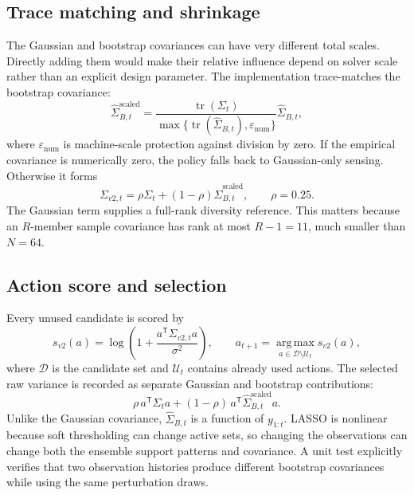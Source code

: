 \documentclass[11pt,a4paper]{article}
\newcommand{\tr}{\operatorname{tr}}
\newcommand{\argmax}{\operatorname*{arg\,max}}
\newcommand{\trans}{^{\mathsf T}}
\begin{document}
\subsection{Trace matching and shrinkage}

The Gaussian and bootstrap covariances can have very different total scales.  Directly
adding them would make their relative influence depend on solver scale rather than an
explicit design parameter.  The implementation trace-matches the bootstrap covariance:
\begin{equation}
\widehat{\Sigma}_{B,t}^{\mathrm{scaled}}
=\frac{\tr(\Sigma_t)}
{\max\{\tr(\widehat{\Sigma}_{B,t}),\varepsilon_{\mathrm{num}}\}}
\widehat{\Sigma}_{B,t},
\label{eq:trace-matching}
\end{equation}
where $\varepsilon_{\mathrm{num}}$ is machine-scale protection against division by zero.  If
the empirical covariance is numerically zero, the policy falls back to Gaussian-only
sensing.  Otherwise it forms
\begin{equation}
\Sigma_{v2,t}
=\rho\Sigma_t+(1-\rho)\widehat{\Sigma}_{B,t}^{\mathrm{scaled}},
\qquad \rho=0.25 .
\label{eq:v2-shrinkage}
\end{equation}
The Gaussian term supplies a full-rank diversity reference.  This matters because an
$R$-member sample covariance has rank at most $R-1=11$, much smaller than $N=64$.

\subsection{Action score and selection}

Every unused candidate is scored by
\begin{equation}
s_{v2}(a)
=\log\!\left(1+\frac{a\trans\Sigma_{v2,t}a}{\sigma^2}\right),
\qquad
a_{t+1}=\argmax_{a\in\mathcal{D}\setminus\mathcal{U}_t}s_{v2}(a),
\label{eq:v2-score}
\end{equation}
where $\mathcal{D}$ is the candidate set and $\mathcal{U}_t$ contains already used actions.
The selected raw variance is recorded as separate Gaussian and bootstrap contributions:
\begin{equation}
\rho\,a\trans\Sigma_ta
+(1-\rho)\,a\trans\widehat{\Sigma}_{B,t}^{\mathrm{scaled}}a .
\label{eq:v2-components}
\end{equation}
Unlike the Gaussian covariance, $\widehat{\Sigma}_{B,t}$ is a function of $y_{1:t}$.  LASSO
is nonlinear because soft thresholding can change active sets, so changing the observations
can change both the ensemble support patterns and covariance.  A unit test explicitly
verifies that two observation histories produce different bootstrap covariances while using
the same perturbation draws.
\end{document}
